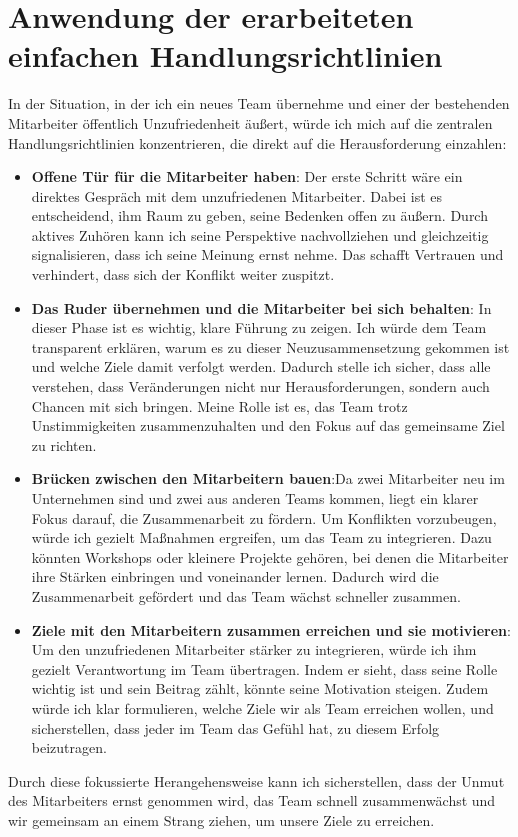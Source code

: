 \section{Anwendung der erarbeiteten \glqq einfachen Handlungsrichtlinien\grqq{}}
In der Situation, in der ich ein neues Team übernehme und einer der bestehenden Mitarbeiter öffentlich Unzufriedenheit äußert, würde ich mich auf die zentralen Handlungsrichtlinien konzentrieren, die direkt auf die Herausforderung einzahlen:

\begin{itemize}
    \item \textbf{Offene Tür für die Mitarbeiter haben}: Der erste Schritt wäre ein direktes Gespräch mit dem unzufriedenen Mitarbeiter. Dabei ist es entscheidend, ihm Raum zu geben, seine Bedenken offen zu äußern. Durch aktives Zuhören kann ich seine Perspektive nachvollziehen und gleichzeitig signalisieren, dass ich seine Meinung ernst nehme. Das schafft Vertrauen und verhindert, dass sich der Konflikt weiter zuspitzt.
    \item \textbf{Das Ruder übernehmen und die Mitarbeiter bei sich behalten}: In dieser Phase ist es wichtig, klare Führung zu zeigen. Ich würde dem Team transparent erklären, warum es zu dieser Neuzusammensetzung gekommen ist und welche Ziele damit verfolgt werden. Dadurch stelle ich sicher, dass alle verstehen, dass Veränderungen nicht nur Herausforderungen, sondern auch Chancen mit sich bringen. Meine Rolle ist es, das Team trotz Unstimmigkeiten zusammenzuhalten und den Fokus auf das gemeinsame Ziel zu richten.
    \item \textbf{Brücken zwischen den Mitarbeitern bauen}:Da zwei Mitarbeiter neu im Unternehmen sind und zwei aus anderen Teams kommen, liegt ein klarer Fokus darauf, die Zusammenarbeit zu fördern. Um Konflikten vorzubeugen, würde ich gezielt Maßnahmen ergreifen, um das Team zu integrieren. Dazu könnten Workshops oder kleinere Projekte gehören, bei denen die Mitarbeiter ihre Stärken einbringen und voneinander lernen. Dadurch wird die Zusammenarbeit gefördert und das Team wächst schneller zusammen.
    \item \textbf{Ziele mit den Mitarbeitern zusammen erreichen und sie motivieren}: Um den unzufriedenen Mitarbeiter stärker zu integrieren, würde ich ihm gezielt Verantwortung im Team übertragen. Indem er sieht, dass seine Rolle wichtig ist und sein Beitrag zählt, könnte seine Motivation steigen. Zudem würde ich klar formulieren, welche Ziele wir als Team erreichen wollen, und sicherstellen, dass jeder im Team das Gefühl hat, zu diesem Erfolg beizutragen.
\end{itemize}

Durch diese fokussierte Herangehensweise kann ich sicherstellen, dass der Unmut des Mitarbeiters ernst genommen wird, das Team schnell zusammenwächst und wir gemeinsam an einem Strang ziehen, um unsere Ziele zu erreichen.
\newpage